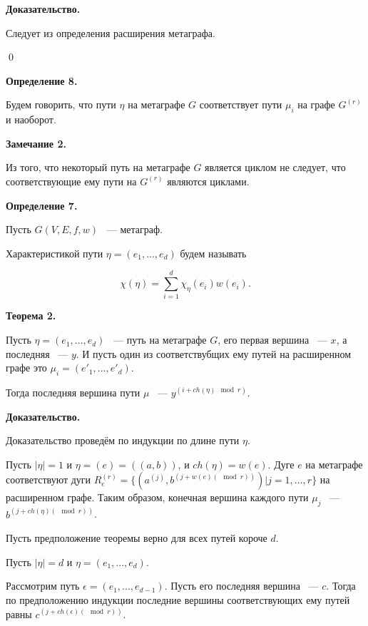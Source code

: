 \documentclass[14pt]{mmcs-article}
\begin{document}
\textbf{Доказательство.}


Следует из определения расширения метаграфа.

\qed

\textbf{Определение 8.}

Будем говорить, что пути $\eta$ на метаграфе $G$ соответствует пути $\mu_i$ на графе $G^{(r)}$ и наоборот.

\textbf{Замечание 2.}

Из того, что некоторый путь на метаграфе $G$ является циклом не следует, что соответствующие ему пути на $G^{(r)}$ являются циклами.


\textbf{Определение 7.}

Пусть $G(V, E, f, w)$ ~--- метаграф.

Характеристикой пути $\eta = (e_1, ..., e_d)$ будем называть

\[
    \chi(\eta) = \sum_{i = 1}^d \chi_{\eta}(e_i) w(e_i).
\]

\textbf{Теорема 2.}

Пусть  $\eta = (e_1, ..., e_d)$ ~--- путь на метаграфе $G$, его первая вершина ~--- $x$, а последняя ~--- $y$. И пусть один из соответствубщих ему путей на расширенном графе это $\mu_i = (e'_1, ..., e'_d)$.

Тогда последняя вершина пути $\mu$ ~--- $y^{(i + ch(\eta)\mod{r})}$.

\textbf{Доказательство.}


Доказательство проведём по индукции по длине пути $\eta$.

Пусть $|\eta| = 1$ и  $\eta = (e) = ((a,b))$, и $ch(\eta) = w(e)$. Дуге $e$ на метаграфе соответствуют дуги $R^{(r)}_e = \{ (a^{(j)}, b^{(j + w(e) (\mod{r}))} ) | j = 1, ..., r \}$
на расширенном графе. Таким образом, конечная вершина каждого пути $\mu_j$ ~--- $b^{(j + ch(\eta) (\mod{r}))}$.

Пусть предположение теоремы верно для всех путей короче $d$.

Пусть $|\eta| = d$ и $\eta = (e_1, ..., e_d)$.

Рассмотрим путь $\epsilon = (e_1, ..., e_{d-1})$. Пусть его последняя вершина ~--- $c$. Тогда по предположению индукции последние вершины соответствующих ему путей равны $c^{(j + ch(\epsilon) (\mod{r}))}$.
\end{document}
